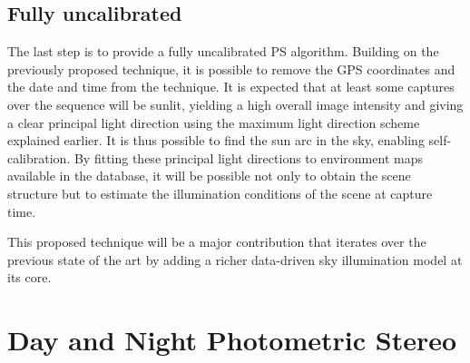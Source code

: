 


\subsection{Fully uncalibrated}
\label{subsec:fullyuncalibrated}
The last step is to provide a fully uncalibrated PS algorithm. Building on the previously proposed technique, it is possible to remove the GPS coordinates and the date and time from the technique. It is expected that at least some captures over the sequence will be sunlit, yielding a high overall image intensity and giving a clear principal light direction using the maximum light direction scheme explained earlier. It is thus possible to find the sun arc in the sky, enabling self-calibration. By fitting these principal light directions to environment maps available in the database, it will be possible not only to obtain the scene structure but to estimate the illumination conditions of the scene at capture time.

This proposed technique will be a major contribution that iterates over the previous state of the art by adding a richer data-driven sky illumination model at its core.


\section{Day and Night Photometric Stereo}
\label{sec:nightandday}

